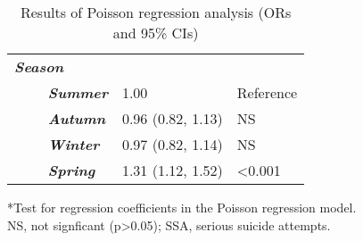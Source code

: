 \begin{table}[!htbp]
\begin{tabular}[c]{@{}lll@{}}
\textbf{\textit{Season}} & ~ & ~  \\
\textbf{\textit{~~~~Summer}} & 1.00 & Reference \\
\textbf{\textit{~~~~Autumn}} & 0.96 (0.82, 1.13) & NS \\
\textbf{\textit{~~~~Winter}} & 0.97 (0.82, 1.14) & NS \\
\textbf{\textit{~~~~Spring}} & 1.31 (1.12, 1.52) & <0.001 \\* 
\bottomrule

\end{tabular}

\footnotesize{*Test for regression coefficients in the Poisson regression model.}\\
\footnotesize{NS, not signficant (p>0.05); SSA, serious suicide attempts.}\\
\caption{Results of Poisson regression analysis (ORs and 95\% CIs)}
\label{tab:T2}
\end{table}

